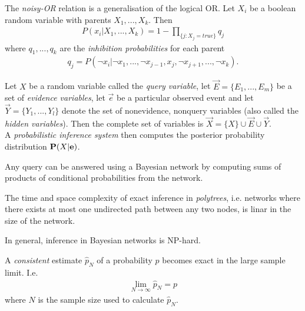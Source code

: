 \documentclass{article}
\begin{document}
\begin{definition}[R\&N p. 518]
    The \emph{noisy-OR} relation is a generalisation of the logical OR. Let $X_i$ be a boolean
    random variable with parents $X_1, ..., X_k$. Then
    \begin{align*}
        P(x_i|X_1, ..., X_k) = 1 - \prod_{\{j:X_j = true\}} q_j
    \end{align*}
    where $q_1,...,q_k$ are the \emph{inhibition probabilities} for each parent
    \begin{align*}
        q_j = P(\neg x_i | \neg x_1, ..., \neg x_{j-1}, x_j, \neg x_{j+1}, ..., \neg x_k).
    \end{align*}
\end{definition}

\begin{definition}[R\&N p. 522]
    Let $X$ be a random variable called the \emph{query variable}, let $\vec E=\{E_1,...,E_m\}$
    be a set of \emph{evidence variables}, let $\vec e$ be a particular observed event and let
    $\vec Y=\{Y_1, ..., Y_l\}$ denote the set of nonevidence, nonquery variables (also
    called the \emph{hidden variables}). Then the complete set of variables is
    $\vec X = \{X\}\cup \vec E \cup \vec Y$.\\
    A \emph{probabilistic inference system} then computes the posterior probability distribution
    $\P(X|\vec e)$.
\end{definition}

\begin{theorem}[R\&N p. 523]
    Any query can be answered using a Bayesian network by computing sums of products of
    conditional probabilities from the network.
\end{theorem}

\begin{theorem}
    The time and space complexity of exact inference in \emph{polytrees}, i.e. networks where there exists at most one
    undirected path between any two nodes, is linar in the size of the network.

    In general, inference in Bayesian networks is NP-hard.
\end{theorem}

\begin{definition}
    A \emph{consistent} estimate $\hat p_N$ of a probability $p$ becomes exact in the large sample limit. I.e.
    \begin{align*}
        \lim_{N\to\infty} \hat p_N = p
    \end{align*}
    where $N$ is the sample size used to calculate $\hat p_N$.
\end{definition}
\end{document}
